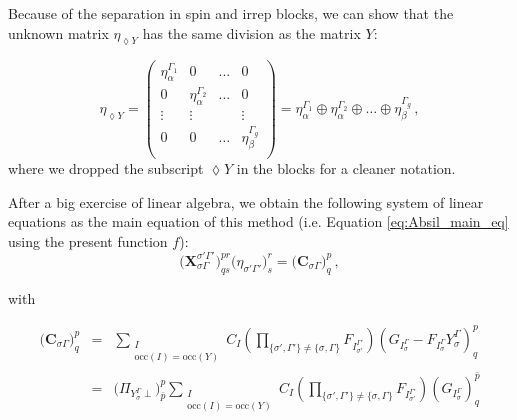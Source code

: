 \documentclass[a4paper,11pt]{article}
\newcommand{\irp}{\ensuremath{\Gamma}}
\newcommand{\irpP}{{\ensuremath{\Gamma'}}}
\begin{document}
Because of the separation in spin and irrep blocks, we can show that the unknown matrix $\eta_{\lozenge Y}$ has the same division as the matrix $Y$:

\begin{equation}\label{eq:eta_spin_irrep_blocks}
  \eta_{\lozenge Y} =
  \begin{pmatrix}
    \eta_\alpha^{\irp_1} & 0 & ... & 0\\
    0 & \eta_\alpha^{\irp_2} & ... & 0 \\
    \vdots & \vdots & & \vdots\\
    0 & 0 &\dots & \eta_\beta^{\irp_g}\\
  \end{pmatrix}
  = \eta_\alpha^{\irp_1} \oplus \eta_\alpha^{\irp_2} \oplus \dots \oplus \eta_\beta^{\irp_g}\,,
\end{equation}
where we dropped the subscript $\lozenge Y$ in the blocks for a cleaner notation.

After a big exercise of linear algebra, we obtain the following system of linear equations as the main equation of this method (i.e. Equation \eqref{eq:Absil_main_eq} using the present function $f$):
\begin{equation}
  \big( \mathbf{X}_{\sigma \irp}^{\sigma' \irpP} \big)^{pr}_{qs} \big( \eta_{\sigma' \irpP} \big)^r_s
  = \big( \mathbf{C}_{\sigma \irp} \big)^p_q\,,
\end{equation}

with

\begin{eqnarray}
  \big( \mathbf{C}_{\sigma \irp} \big)^p_q &=&
  \sum_{\substack{I\\\text{occ}(I) = \text{occ}(Y)}} C_I
  \left( \prod_{\{\sigma', \irpP\} \ne \{\sigma, \irp\}} F_{I_{\sigma'}^\irpP} \right)
  \left( G_{I_\sigma^\irp} - F_{I_\sigma^\irp} Y_\sigma^\irp  \right)^p_q\\
  &=&
  \big( \Pi_{Y_\sigma^\irp \perp} \big)^p_{\bar{p}}
  \sum_{\substack{I\\\text{occ}(I) = \text{occ}(Y)}} C_I
  \left( \prod_{\{\sigma', \irpP\} \ne \{\sigma, \irp\}} F_{I_{\sigma'}^\irpP} \right)
  \left( G_{I_\sigma^\irp} \right)^{\bar{p}}_q
\end{eqnarray}
\end{document}
